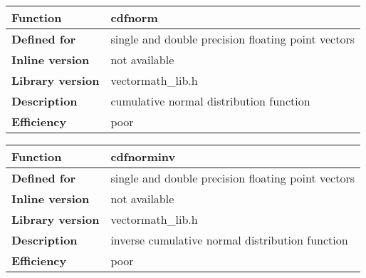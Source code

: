 \documentclass[vcl_manual.tex]{subfiles}
\begin{document}
\begin{tabular}{|p{30mm}|p{120mm}|}
\hline
\bfseries Function & cdfnorm \\ \hline
\bfseries Defined for & single and double precision floating point vectors \\ \hline
\bfseries Inline version & not available \\ \hline
\bfseries Library version & vectormath\_lib.h \\ \hline
\bfseries Description & cumulative normal distribution function \\ \hline
\bfseries Efficiency & poor \\ \hline
\end{tabular}


\begin{tabular}{|p{30mm}|p{120mm}|}
\hline
\bfseries Function & cdfnorminv \\ \hline
\bfseries Defined for & single and double precision floating point vectors \\ \hline
\bfseries Inline version & not available \\ \hline
\bfseries Library version & vectormath\_lib.h \\ \hline
\bfseries Description & inverse cumulative normal distribution function \\ \hline
\bfseries Efficiency & poor \\ \hline
\end{tabular}
\end{document}
